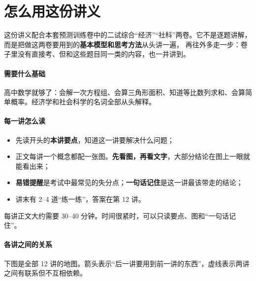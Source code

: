 \clearpage
\section*{怎么用这份讲义}

这份讲义配合本套预测训练卷中的二试综合“经济”“社科”两卷。它不是逐题讲解，而是把做这两卷要用到的\textbf{基本模型和思考方法}从头讲一遍，
再往外多走一步：卷子里没有直接考、但和这些题目同一类的内容，也一并讲到。

\paragraph{需要什么基础}
高中数学就够了：会解一次方程组、会算三角形面积、知道等比数列求和、会算简单概率。经济学和社会科学的名词全部从头解释。

\paragraph{每一讲怎么读}
\begin{itemize}
  \item 先读开头的\textbf{本讲要点}，知道这一讲要解决什么问题；
  \item 正文每讲一个概念都配一张图。\textbf{先看图，再看文字}，大部分结论在图上一眼就能看出来；
  \item \textcolor{mjVermilion}{\textbf{易错提醒}}是考试中最常见的失分点；\textcolor{mjPine}{\textbf{一句话记住}}是这一讲最该带走的结论；
  \item 讲末有 2--4 道“练一练”，答案在第 12 讲。
\end{itemize}
每讲正文大约需要 30--40 分钟。时间很紧时，可以只读要点、图和“一句话记住”。

\paragraph{各讲之间的关系}
下图是全部 12 讲的地图。箭头表示“后一讲要用到前一讲的东西”，虚线表示两讲之间有联系但不互相依赖。

